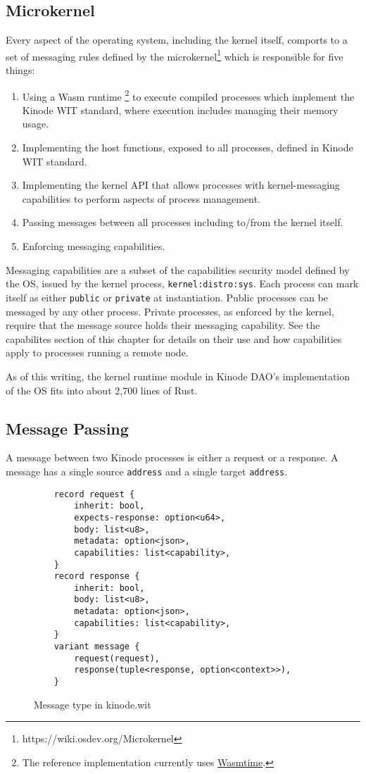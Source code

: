 \documentclass[runningheads]{llncs}
\begin{document}
\subsection{Microkernel}

Every aspect of the operating system, including the kernel itself, comports to a set of messaging rules defined by the microkernel\footnote{https://wiki.osdev.org/Microkernel} which is responsible for five things:
\begin{enumerate}
    \item Using a Wasm runtime
    \footnote{The reference implementation currently uses \href{https://wasmtime.dev}{Wasmtime}.}
    to execute compiled processes which implement the Kinode WIT standard, where execution includes managing their memory usage.
    \item Implementing the host functions, exposed to all processes, defined in Kinode WIT standard.
    \item Implementing the kernel API that allows processes with kernel-messaging capabilities to perform aspects of process management.
    \item Passing messages between all processes including to/from the kernel itself.
    \item Enforcing messaging capabilities.
\end{enumerate}

Messaging capabilities are a subset of the capabilities security model defined by the OS, issued by the kernel process, \verb|kernel:distro:sys|.
Each process can mark itself as either \verb|public| or \verb|private| at instantiation.
Public processes can be messaged by any other process.
Private processes, as enforced by the kernel, require that the message source holds their messaging capability.
See the capabilites section of this chapter for details on their use and how capabilities apply to processes running a remote node.

As of this writing, the kernel runtime module in Kinode DAO's implementation of the OS fits into about 2,700 lines of Rust.

\subsection{Message Passing}

A message between two Kinode processes is either a request or a response.
A message has a single source \verb|address| and a single target \verb|address|.

\begin{figure}[H]
    \centering
    \begin{lstlisting}
    record request {
        inherit: bool,
        expects-response: option<u64>,
        body: list<u8>,
        metadata: option<json>,
        capabilities: list<capability>,
    }
    record response {
        inherit: bool,
        body: list<u8>,
        metadata: option<json>,
        capabilities: list<capability>,
    }
    variant message {
        request(request),
        response(tuple<response, option<context>>),
    }
    \end{lstlisting}
    \caption{Message type in kinode.wit}
    \label{fig:WIT Types 2}
\end{figure}
\end{document}
